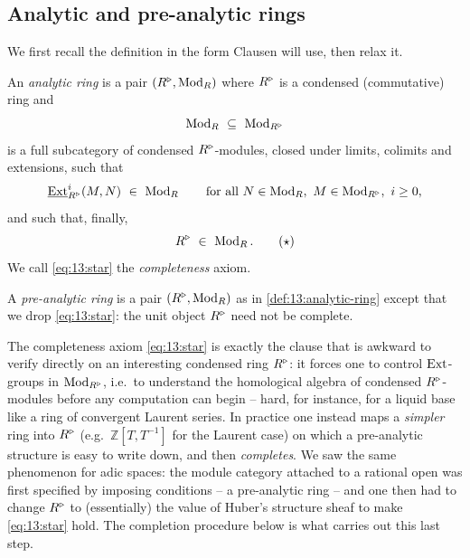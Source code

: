 \subsection{Analytic and pre-analytic rings}

We first recall the definition in the form Clausen will use, then relax it.

\begin{definition}
\label{def:13:analytic-ring}
An \emph{analytic ring} is a pair $(R^{\triangleright}, \operatorname{Mod}_R)$ where $R^{\triangleright}$ is a condensed
(commutative) ring and
\begin{equation*}
\Mod_R\ \subseteq\ \Mod_{\ur R}
\end{equation*}
is a full subcategory of condensed $R^{\triangleright}$-modules, closed under limits,
colimits and extensions, such that
\begin{equation}
\label{eq:13:ext-axiom}
\iExt^{i}_{\ur R}(M,N)\ \in\ \Mod_R\qquad\text{for all }N\in\Mod_R,\ M\in\Mod_{\ur R},\ i\ge 0,
\end{equation}
and such that, finally,
\begin{equation*}
\label{eq:13:star}
R^{\triangleright}\ \in\ \operatorname{Mod}_R.\tag{$\star$}
\end{equation*}
We call \eqref{eq:13:star} the \emph{completeness} axiom.
\end{definition}

\begin{definition}
\label{def:13:pre-analytic-ring}
A \emph{pre-analytic ring} is a pair $(R^{\triangleright}, \operatorname{Mod}_R)$ as in
\cref{def:13:analytic-ring} except that we drop \eqref{eq:13:star}: the unit
object $R^{\triangleright}$ need not be complete.
\end{definition}

\begin{remark}
\label{rmk:13:why-pre-analytic}
The completeness axiom \eqref{eq:13:star} is exactly the clause that is awkward
to verify directly on an interesting condensed ring $R^{\triangleright}$: it forces one to
control $\operatorname{Ext}$-groups in $\operatorname{Mod}_{R^{\triangleright}}$, i.e.\ to understand the homological
algebra of condensed $R^{\triangleright}$-modules before any computation can begin -- hard,
for instance, for a liquid base like a ring of convergent Laurent series. In
practice one instead maps a \emph{simpler} ring into $R^{\triangleright}$ (e.g.\
$\mathbb{Z}[T,T^{-1}]$ for the Laurent case) on which a pre-analytic structure is
easy to write down, and then \emph{completes}. We saw the same phenomenon for
adic spaces: the module category attached to a rational open was first specified
by imposing conditions -- a pre-analytic ring -- and one then had to change
$R^{\triangleright}$ to (essentially) the value of Huber's structure sheaf to make
\eqref{eq:13:star} hold. The completion procedure below is what carries out this
last step.
\end{remark}

